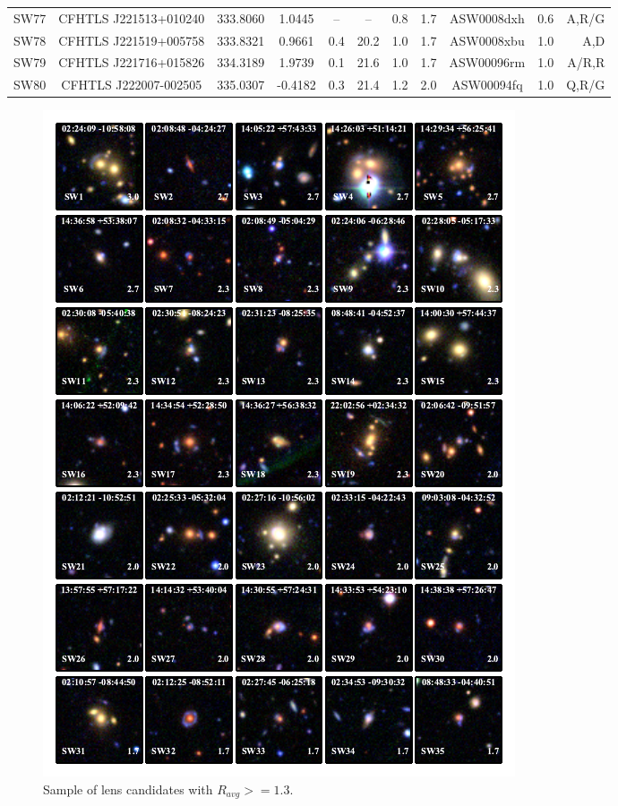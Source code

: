 \documentclass[useAMS,usenatbib,a4paper]{mn2e}
\begin{document}
\begin{center}
\begin{longtable}{lcccccccccr}
SW77 & CFHTLS J221513+010240 &  333.8060 &    1.0445 &  --  &  --  &  0.8 &  1.7 & ASW0008dxh &  0.6  &  A,R/G   \\ 
SW78 & CFHTLS J221519+005758 &  333.8321 &    0.9661 &  0.4 & 20.2 &  1.0 &  1.7 & ASW0008xbu &  1.0  &  A,D   \\ 
SW79 & CFHTLS J221716+015826 &  334.3189 &    1.9739 &  0.1 & 21.6 &  1.0 &  1.7 & ASW00096rm &  1.0  &  A/R,R   \\ 
SW80 & CFHTLS J222007-002505 &  335.0307 &   -0.4182 &  0.3 & 21.4 &  1.2 &  2.0 & ASW00094fq &  1.0  &  Q,R/G   \\ 
\end{longtable}
\end{center}


\twocolumn

\begin{figure}
\begin{center}
\includegraphics[scale=2.0]{sw-cfhtls-figs/lenscandfin.pdf}
\caption{ \label{fig:lch1}
Sample of lens candidates with $R_{avg}>=1.3$.
}
\end{center}
\end{figure}
\end{document}
